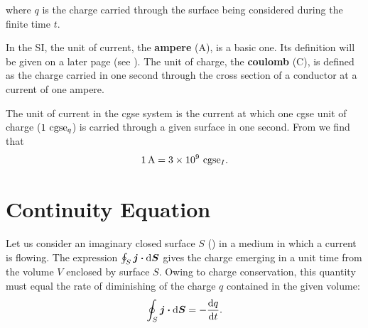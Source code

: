 \noindent
where $q$ is the charge carried through the surface being considered during the finite time $t$.

In the SI, the unit of current, the \textbf{ampere} (\si{\ampere}), is a basic one. Its definition will be given on a later page (see ). The unit of charge, the \textbf{coulomb} (\si{\coulomb}), is defined as the charge carried in one second through the cross section of a conductor at a current of one ampere.

The unit of current in the cgse system is the current at which one cgse unit of charge ($1 \text{~cgse$_{q}$}$) is carried through a given surface in one second. From  we find that
\begin{equation}\label{eq:5_8}
    \SI{1}{\ampere} = \num{3e9} \text{~cgse$_{I}$}.
\end{equation}

\section{Continuity Equation}\label{sec:5_2}

Let us consider an imaginary closed surface $S$ () in a medium in which a current is flowing. The expression $\oint_S\boldsymbol{j}\boldsymbol{\cdot}\mathrm{d}\boldsymbol{S}$ gives the charge emerging in a unit time from the volume $V$ enclosed by surface $S$. Owing to charge conservation, this quantity must equal the rate of diminishing of the charge $q$ contained in the given volume:
\begin{equation*}
    \oint_S \boldsymbol{j} \boldsymbol{\cdot} \mathrm{d}\boldsymbol{S} = - \dfrac{\mathrm{d} q}{\mathrm{d} t}.
\end{equation*}


